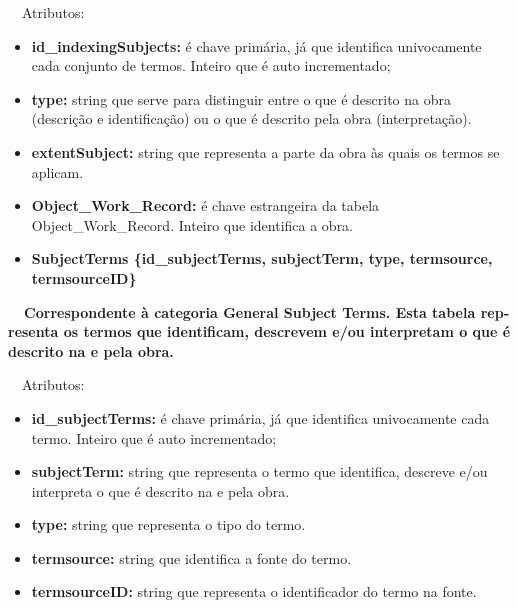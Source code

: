 \documentclass[letterpaper]{article}
\newcommand\textstyleStrongEmphasis[1]{\textbf{#1}}
\newcommand\liststyleLi{%
\renewcommand\labelitemi{{\textbullet}}
\renewcommand\labelitemii{[27A2?]}
\renewcommand\labelitemiii{{\textbullet}}
\renewcommand\labelitemiv{{\textbullet}}
}
\newcommand\liststyleLvi{%
\renewcommand\labelitemi{[27A2?]}
\renewcommand\labelitemii{[27A2?]}
\renewcommand\labelitemiii{[27A2?]}
\renewcommand\labelitemiv{[27A2?]}
}
\newcommand\liststyleLxiv{%
\renewcommand\labelitemi{[27A2?]}
\renewcommand\labelitemii{[27A2?]}
\renewcommand\labelitemiii{[27A2?]}
\renewcommand\labelitemiv{[27A2?]}
}
\begin{document}
\bigskip

{
\ \ Atributos:}

\liststyleLvi
\begin{itemize}
\item {
\textbf{id\_}\textbf{indexingSubjects}\textbf{:} \'e chave prim\'aria,
j\'a que identifica univocamente cada conjunto de termos. Inteiro que
\'e auto incrementado;}
\item {
\textbf{type:} string que serve para distinguir entre o que \'e descrito
na obra (descri\c{c}\~ao e identifica\c{c}\~ao) ou o que \'e descrito
pela obra (interpreta\c{c}\~ao).}
\item {
\textbf{extentSubject:} string que representa a parte da obra \`as quais
os termos se aplicam.}
\item {
\textbf{Object\_Work\_Record:}\textit{ }\'e chave estrangeira da tabela
Object\_Work\_Record. Inteiro que identifica a obra.}
\end{itemize}

\bigskip

\liststyleLi
\begin{itemize}
\item {\bfseries
SubjectTerms \textmd{\{}\textmd{id\_subjectTerms}\textmd{, subjectTerm,
type, termsource, termsourceID\}}}
\end{itemize}
{\bfseries
\foreignlanguage{english}{\textmd{\ \ Correspondente \`a categoria
}}\textstyleStrongEmphasis{\foreignlanguage{english}{General Subject
Terms}}\foreignlanguage{english}{\textmd{. Esta
}}\textstyleStrongEmphasis{\foreignlanguage{english}{\textmd{tabela}}}\foreignlanguage{english}{\textmd{
representa os termos que identificam, descrevem e/ou interpretam o que
\'e descrito na e pela obra.}}}


\bigskip

{
\ \ Atributos:}

\liststyleLxiv
\begin{itemize}
\item {
\textbf{id\_subjectTerms: }\'e chave prim\'aria, j\'a que identifica
univocamente cada termo. Inteiro que \'e auto incrementado;}
\item {
\textbf{subjectTerm: }string que representa o termo que identifica,
descreve e/ou interpreta o que \'e descrito na e pela obra.}
\item {
\textbf{type: }string que representa o tipo do termo.}
\item {
\textbf{termsource: }string que identifica a fonte do termo.}
\item {
\textbf{termsourceID:} string que representa o identificador do termo na
fonte.}
\end{itemize}
\end{document}
